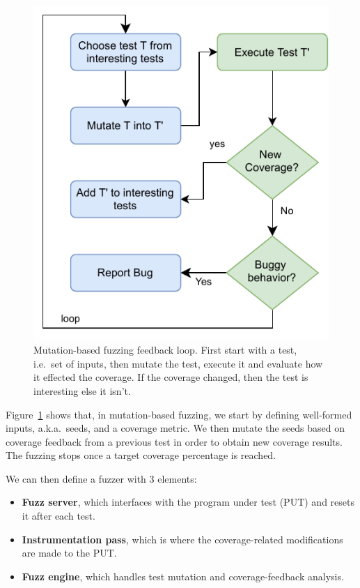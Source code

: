 \documentclass[conference]{IEEEtran}
\begin{document}
\begin{figure}
  \centering
    \includegraphics[width=0.8\linewidth]{mutation-fuzzing.pdf}
    \caption{Mutation-based fuzzing feedback loop. First start with a test, i.e.\ set of inputs, then mutate the test, execute it and evaluate how it effected the coverage. If the coverage changed, then the test is interesting else it isn't.}
\label{fig:mut-fuzz}
\end{figure}

Figure~\ref{fig:mut-fuzz} shows that, in mutation-based fuzzing, we start by defining well-formed inputs, a.k.a.\ seeds, and a coverage metric. 
We then mutate the seeds based on coverage feedback from a previous test in order to obtain new coverage results. 
The fuzzing stops once a target coverage percentage is reached.

We can then define a fuzzer with 3 elements:
\begin{itemize}
\item \textbf{Fuzz server}, which interfaces with the program under test (PUT) and resets it after each test.
\item \textbf{Instrumentation pass}, which is where the coverage-related modifications are made to the PUT.
\item \textbf{Fuzz engine}, which handles test mutation and coverage-feedback analysis.
\end{itemize}
\end{document}
